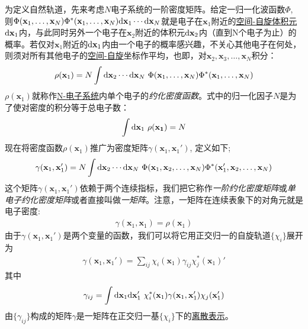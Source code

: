 为定义自然轨道，先来考虑$N$电子系统的一阶密度矩阵。给定一归一化波函数$\Phi$, 则$\Phi(\mathbf{x}_1,\ldots,\mathbf{x}_N)\Phi^*(\mathbf{x}_1,\ldots,\mathbf{x}_N)\ddx_1\cdots\ddx_N$就是电子在$\mathbf{x}_1$附近的\underline{\underline{空间-自旋}体积元}$\ddx_1$内，与此同时另外一个电子在$\mathbf{x}_2$附近的体积元$\ddx_2$内（直到N个电子为止）的概率。若仅对$\mathbf{x}_1$附近的$\ddx_1$内由一个电子的概率感兴趣，不关心其他电子在何处，则须对所有其他电子的\underline{空间-自旋}坐标作平均，也即，对$\mathbf{x}_2,\mathbf{x}_3,\ldots,\mathbf{x}_N$积分：
\begin{align}
\rho(\mathbf{x}_1) = N \int\ddx_2\cdots\ddx_N \,\, \Phi(\mathbf{x}_1,\ldots,\mathbf{x}_N)\Phi^*(\mathbf{x}_1,\ldots,\mathbf{x}_N)
\end{align}
$\rho(\mathbf{x}_1)$就称作\underline{N-电子系统}内单个电子的\emph{约化密度函数}。式中的归一化因子$N$是为了使对密度的积分等于总电子数：
\begin{align}
\int\ddx_1\,\,\rho(\mathbf{x_1}) = N
\end{align}
现在将密度函数$\rho(\mathbf{x}_1)$推广为密度矩阵$\gamma(\mathbf{x}_1,\mathbf{x}_1')$, 定义如下;
\begin{align}
\label{4.35}
\gamma(\mathbf{x}_1,\mathbf{x}_1') = N \int\ddx_2\cdots\ddx_N \,\, \Phi(\mathbf{x}_1,\mathbf{x}_2,\ldots,\mathbf{x}_N)\Phi^*(\mathbf{x}_1',\mathbf{x}_2,\ldots,\mathbf{x}_N)
\end{align}
这个矩阵$\gamma(\mathbf{x}_1,\mathbf{x}_1')$依赖于两个连续指标，我们把它称作\emph{一阶约化密度矩阵}或\emph{单电子约化密度矩阵}或者直接叫做\emph{一矩阵}。注意，一矩阵在连续表象下的对角元就是电子密度:
\begin{align}
\gamma(\mathbf{x}_1,\mathbf{x}_1) = \rho(\mathbf{x}_1)
\end{align}
由于$\gamma(\mathbf{x}_1,\mathbf{x}_1')$是两个变量的函数，我们可以将它用正交归一的\hft 自旋轨道$\{\chi_i\}$展开为
\begin{align}
\gamma(\mathbf{x}_1,\mathbf{x}_1') = \sum_{ij} \chi_i(\mathbf{x}_1) \gamma_{ij} \chi_j^*(\mathbf{x}_1)'
\label{4.37}
\end{align}
其中
\begin{align}
\gamma_{ij} = \int\ddx_1\ddx_1'\,\,\chi_i^*(\mathbf{x}_1)\gamma(\mathbf{x}_1,\mathbf{x}_1')\chi_j(\mathbf{x}_1')
\end{align}
由$\{\gamma_{ij}\}$构成的矩阵$\gamma$是一矩阵在正交归一基$\{\chi_i\}$下的\underline{离散表示}。

